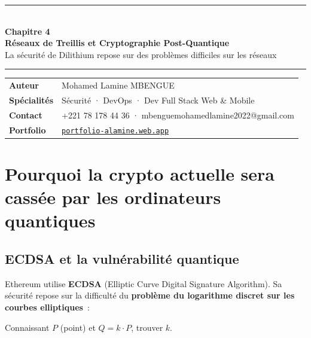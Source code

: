 \documentclass[12pt, a4paper]{article}
\begin{document}
\begin{center}
  {\color{suva_blue}\rule{\linewidth}{2pt}}\\[0.5cm]
  {\Huge\bfseries\color{suva_blue} Chapitre 4}\\[0.3cm]
  {\large\bfseries Réseaux de Treillis et Cryptographie Post-Quantique}\\[0.2cm]
  {\small\color{gray} La sécurité de Dilithium repose sur des problèmes difficiles sur les réseaux}\\[0.3cm]
  {\color{suva_blue}\rule{\linewidth}{2pt}}
\end{center}

\vspace{0.3cm}
\begin{tcolorbox}[colback=suva_blue!5, colframe=suva_blue!40,
  left=6pt, right=6pt, top=4pt, bottom=4pt]
\small
\begin{tabular}{ll}
  \textbf{Auteur}      & Mohamed Lamine MBENGUE \\
  \textbf{Spécialités} & Sécurité · DevOps · Dev Full Stack Web \& Mobile \\
  \textbf{Contact}     & +221 78 178 44 36 · mbenguemohamedlamine2022@gmail.com \\
  \textbf{Portfolio}   & \href{https://portfolio-alamine.web.app}{\texttt{portfolio-alamine.web.app}} \\
\end{tabular}
\end{tcolorbox}
\vspace{0.3cm}

\tableofcontents
\newpage

\section{Pourquoi la crypto actuelle sera cassée par les ordinateurs quantiques}

\subsection{ECDSA et la vulnérabilité quantique}

Ethereum utilise \textbf{ECDSA} (Elliptic Curve Digital Signature Algorithm).
Sa sécurité repose sur la difficulté du \textbf{problème du logarithme
discret sur les courbes elliptiques}~:

\begin{center}
Connaissant $P$ (point) et $Q = k \cdot P$, trouver $k$.
\end{center}
\end{document}
